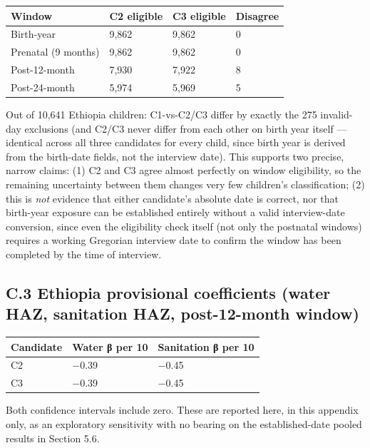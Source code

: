 \begingroup\fontsize{10}{15}\selectfont
\begin{longtable}{llll}
\toprule
Window & C2 eligible & C3 eligible & Disagree \\
\midrule
\endhead
Birth-year & 9,862 & 9,862 & 0 \\
Prenatal (9 months) & 9,862 & 9,862 & 0 \\
Post-12-month & 7,930 & 7,922 & 8 \\
Post-24-month & 5,974 & 5,969 & 5 \\
\bottomrule
\end{longtable}
\endgroup

Out of 10,641 Ethiopia children: C1-vs-C2/C3 differ by exactly the 275 invalid-day exclusions (and C2/C3 never differ from each other on birth year itself --- identical across all three candidates for every child, since birth year is derived from the birth-date fields, not the interview date). This supports two precise, narrow claims: (1) C2 and C3 agree almost perfectly on window eligibility, so the remaining uncertainty between them changes very few children's classification; (2) this is \textit{not} evidence that either candidate's absolute date is correct, nor that birth-year exposure can be established entirely without a valid interview-date conversion, since even the eligibility check itself (not only the postnatal windows) requires a working Gregorian interview date to confirm the window has been completed by the time of interview.

\subsection*{C.3 Ethiopia provisional coefficients (water HAZ, sanitation HAZ, post-12-month window)}

\begingroup\fontsize{10}{15}\selectfont
\begin{longtable}{lll}
\toprule
Candidate & Water β per 10 & Sanitation β per 10 \\
\midrule
\endhead
C2 & −0.39 & −0.45 \\
C3 & −0.39 & −0.45 \\
\bottomrule
\end{longtable}
\endgroup

Both confidence intervals include zero. These are reported here, in this appendix only, as an exploratory sensitivity with no bearing on the established-date pooled results in Section 5.6.

